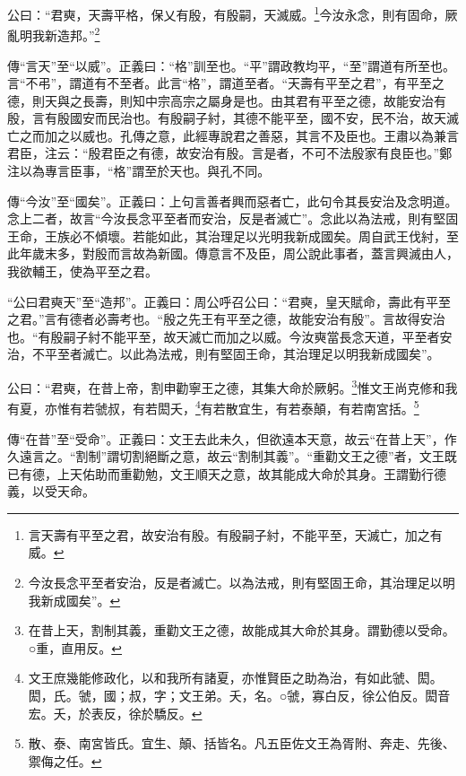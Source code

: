 公曰：“君奭，天壽平格，保乂有殷，有殷嗣，天滅威。\footnote{言天壽有平至之君，故安治有殷。有殷嗣子紂，不能平至，天滅亡，加之有威。}今汝永念，則有固命，厥亂明我新造邦。”\footnote{今汝長念平至者安治，反是者滅亡。以為法戒，則有堅固王命，其治理足以明我新成國矣”。}


{\noindent\zhuan{}\fzbyks 傳“言天”至“以威”。正義曰：“格”訓至也。“平”謂政教均平，“至”謂道有所至也。言“不弔”，謂道有不至者。此言“格”，謂道至者。“天壽有平至之君”，有平至之德，則天與之長壽，則知中宗高宗之屬身是也。由其君有平至之德，故能安治有殷，言有殷國安而民治也。有殷嗣子紂，其德不能平至，國不安，民不治，故天滅亡之而加之以威也。孔傳之意，此經專說君之善惡，其言不及臣也。王肅以為兼言君臣，注云：“殷君臣之有德，故安治有殷。言是者，不可不法殷家有良臣也。”鄭注以為專言臣事，“格”謂至於天也。與孔不同。 \par}

{\noindent\zhuan{}\fzbyks 傳“今汝”至“國矣”。正義曰：上句言善者興而惡者亡，此句令其長安治及念明道。念上二者，故言“今汝長念平至者而安治，反是者滅亡”。念此以為法戒，則有堅固王命，王族必不傾壞。若能如此，其治理足以光明我新成國矣。周自武王伐紂，至此年歲末多，對殷而言故為新國。傳意言不及臣，周公說此事者，蓋言興滅由人，我欲輔王，使為平至之君。 \par}

{\noindent\shu{}\fzkt “公曰君奭天”至“造邦”。正義曰：周公呼召公曰：“君奭，皇天賦命，壽此有平至之君。”言有德者必壽考也。“殷之先王有平至之德，故能安治有殷”。言故得安治也。“有殷嗣子紂不能平至，故天滅亡而加之以威。今汝奭當長念天道，平至者安治，不平至者滅亡。以此為法戒，則有堅固王命，其治理足以明我新成國矣”。 \par}

公曰：“君奭，在昔上帝，割申勸寧王之德，其集大命於厥躬。\footnote{在昔上天，割制其義，重勸文王之德，故能成其大命於其身。謂勤德以受命。○重，直用反。}惟文王尚克修和我有夏，亦惟有若虢叔，有若閎夭，\footnote{文王庶幾能修政化，以和我所有諸夏，亦惟賢臣之助為治，有如此虢、閎。閎，氏。虢，國；叔，字；文王弟。夭，名。○虢，寡白反，徐公伯反。閎音宏。夭，於表反，徐於驕反。}有若散宜生，有若泰顛，有若南宮括。\footnote{散、泰、南宮皆氏。宜生、顛、括皆名。凡五臣佐文王為胥附、奔走、先後、禦侮之任。}


{\noindent\zhuan{}\fzbyks 傳“在昔”至“受命”。正義曰：文王去此未久，但欲遠本天意，故云“在昔上天”，作久遠言之。“割制”謂切割絕斷之意，故云“割制其義”。“重勸文王之德”者，文王既已有德，上天佑助而重勸勉，文王順天之意，故其能成大命於其身。王謂勤行德義，以受天命。 \par}

